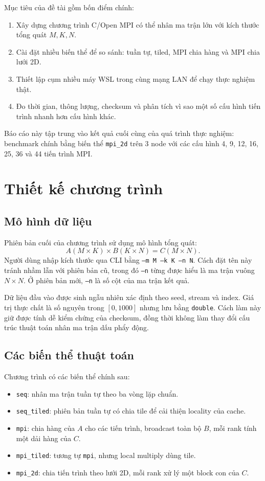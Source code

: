 \documentclass[12pt,a4paper]{article}
\newcommand{\code}[1]{\texttt{#1}}
\begin{document}
Mục tiêu của đề tài gồm bốn điểm chính:
\begin{enumerate}
  \item Xây dựng chương trình C/Open MPI có thể nhân ma trận lớn với kích thước tổng quát $M,K,N$.
  \item Cài đặt nhiều biến thể để so sánh: tuần tự, tiled, MPI chia hàng và MPI chia lưới 2D.
  \item Thiết lập cụm nhiều máy WSL trong cùng mạng LAN để chạy thực nghiệm thật.
  \item Đo thời gian, thông lượng, checksum và phân tích vì sao một số cấu hình tiến trình nhanh hơn cấu hình khác.
\end{enumerate}

Báo cáo này tập trung vào kết quả cuối cùng của quá trình thực nghiệm: benchmark chính bằng biến thể \code{mpi\_2d} trên 3 node với các cấu hình 4, 9, 12, 16, 25, 36 và 44 tiến trình MPI.

\section{Thiết kế chương trình}
\subsection{Mô hình dữ liệu}
Phiên bản cuối của chương trình sử dụng mô hình tổng quát:
\[
  A(M \times K) \times B(K \times N) = C(M \times N).
\]
Người dùng nhập kích thước qua CLI bằng \code{--m M --k K --n N}. Cách đặt tên này tránh nhầm lẫn với phiên bản cũ, trong đó \code{--n} từng được hiểu là ma trận vuông $N \times N$. Ở phiên bản mới, \code{--n} là số cột của ma trận kết quả.

Dữ liệu đầu vào được sinh ngẫu nhiên xác định theo seed, stream và index. Giá trị thực chất là số nguyên trong $[0,1000]$ nhưng lưu bằng \code{double}. Cách làm này giữ được tính dễ kiểm chứng của checksum, đồng thời không làm thay đổi cấu trúc thuật toán nhân ma trận dấu phẩy động.

\subsection{Các biến thể thuật toán}
Chương trình có các biến thể chính sau:
\begin{itemize}
  \item \code{seq}: nhân ma trận tuần tự theo ba vòng lặp chuẩn.
  \item \code{seq\_tiled}: phiên bản tuần tự có chia tile để cải thiện locality của cache.
  \item \code{mpi}: chia hàng của $A$ cho các tiến trình, broadcast toàn bộ $B$, mỗi rank tính một dải hàng của $C$.
  \item \code{mpi\_tiled}: tương tự \code{mpi}, nhưng local multiply dùng tile.
  \item \code{mpi\_2d}: chia tiến trình theo lưới 2D, mỗi rank xử lý một block con của $C$.
\end{itemize}
\end{document}
